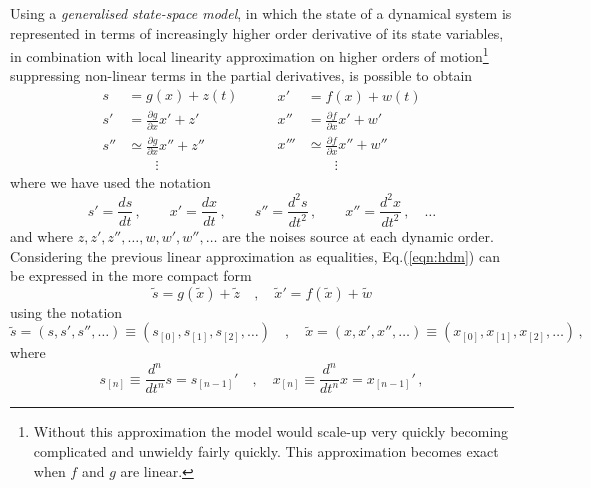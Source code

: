 \documentclass[a4paper, 10pt]{article}
\begin{document}
Using a \emph{generalised state-space model}, in which the state of a dynamical system is represented in terms of increasingly higher order derivative of its state variables, in combination with local linearity approximation on higher orders of motion\footnote{Without this approximation the model would scale-up very quickly becoming complicated and unwieldy fairly quickly. This approximation becomes exact when $f$ and $g$ are linear.} suppressing non-linear terms in the partial derivatives, is possible to obtain 
\begin{equation}
  \begin{split}
    s &= g(x) + z(t) \\
    s' &= \frac{\partial g}{\partial x}x' + z' \\
    s'' & \simeq \frac{\partial g}{\partial x}x'' + z''\\
    				& \qquad \vdots
  \end{split}
  \qquad
  \begin{split}
    x' &= f(x) + w(t) \\
    x'' &= \frac{\partial f}{\partial x}x' + w' \\
    x''' & \simeq \frac{\partial f}{\partial x}x'' + w''\\
    				& \qquad \vdots
  \end{split}
\label{eqn:hdm}
\end{equation}
where we have used the notation
\begin{equation}
s' = \frac{ds}{dt} \, , \qquad x'=\frac{dx}{dt} \, , \qquad s''= \frac{d^2 s}{dt^2} \, , \qquad x''= \frac{d^2 x}{dt^2} \, , \quad \dots
\end{equation}
and where $z,z',z'',\dots, w,w',w'',\dots$ are the noises source at each dynamic order.
Considering the previous linear approximation as equalities, Eq.(\ref{eqn:hdm}) can be expressed in the more compact form
\begin{equation}
\tilde{s} = g(\tilde{x}) + \tilde{z} \quad , \quad \tilde{x}' = f(\tilde{x}) + \tilde{w}
\end{equation}
using the notation 
\begin{equation}
\tilde{s} = (s, s', s'', \dots) \equiv (s_{[0]}, s_{[1]}, s_{[2]}, \dots)  \quad , \quad \tilde{x} = (x, x ', x '', \dots) \equiv (x_{[0]}, x_{[1]}, x_{[2]}, \dots)\, ,
\end{equation}
where
\begin{equation}
s_{[n]} \equiv \frac{d^n}{dt^n}s = s_{[n-1]}' \quad , \quad x_{[n]} \equiv \frac{d^n}{dt^n}x = x_{[n-1]}' \, ,
\end{equation}
\end{document}
